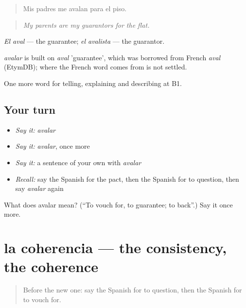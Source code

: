 \begin{quote}
Mis padres me avalan para el piso.
\end{quote}

\begin{quote}
\emph{My parents are my guarantors for the flat.}
\end{quote}

\emph{El aval} — the guarantee; \emph{el avalista} — the guarantor.

\begin{cousinweb}
\emph{avalar} is built on \emph{aval} 'guarantee', which was borrowed from French \emph{aval} (EtymDB); where the French word comes from is not settled.
\end{cousinweb}

\begin{grammarlens}[title={What you've built}]
One more word for telling, explaining and describing at B1.
\end{grammarlens}

\subsection*{Your turn}
\begin{itemize}
\raggedright
  \item \emph{Say it:} \emph{avalar}
  \item \emph{Say it:} \emph{avalar}, once more
  \item \emph{Say it:} a sentence of your own with \emph{avalar}
  \item \emph{Recall:} say the Spanish for the pact, then the Spanish for to question, then say \emph{avalar} again
\end{itemize}

\begin{tcolorbox}[breakable,colback=teal!4,colframe=teal!35!black,title={Before you move on}]
What does avalar mean? (\textquotedblleft{}To vouch for, to guarantee; to back\textquotedblright{}.) Say it once more.
\end{tcolorbox}
\section[la coherencia]{la coherencia — the consistency, the coherence}

\label{lesson:ES-C635-coherencia}



\begin{quote}
Before the new one: say the Spanish for to question, then the Spanish for to vouch for.
\end{quote}

